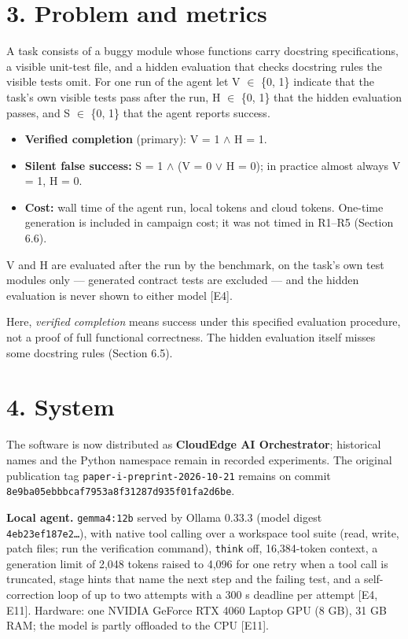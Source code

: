 \documentclass[11pt]{article}
\newcommand{\code}[1]{\texttt{#1}}
\begin{document}
\section*{3. Problem and metrics}
A task consists of a buggy module whose functions carry docstring specifications, a visible unit-test file, and a hidden evaluation that checks docstring rules the visible tests omit. For one run of the agent let V $\in$ \{0, 1\} indicate that the task's own visible tests pass after the run, H $\in$ \{0, 1\} that the hidden evaluation passes, and S $\in$ \{0, 1\} that the agent reports success.

\begin{itemize}
\item \textbf{Verified completion} (primary): V = 1 $\wedge$ H = 1.
\item \textbf{Silent false success:} S = 1 $\wedge$ (V = 0 $\vee$ H = 0); in practice almost always V = 1, H = 0.
\item \textbf{Cost:} wall time of the agent run, local tokens and cloud tokens. One-time generation is included in campaign cost; it was not timed in R1–R5 (Section 6.6).
\end{itemize}
V and H are evaluated after the run by the benchmark, on the task’s own test modules only — generated contract tests are excluded — and the hidden evaluation is never shown to either model [E4].

Here, \emph{verified completion} means success under this specified evaluation procedure, not a proof of full functional correctness. The hidden evaluation itself misses some docstring rules (Section 6.5).

\section*{4. System}
The software is now distributed as \textbf{CloudEdge AI Orchestrator}; historical names and the Python namespace remain in recorded experiments. The original publication tag \code{paper-\allowbreak{}i-\allowbreak{}preprint-\allowbreak{}2026-\allowbreak{}10-\allowbreak{}21} remains on commit \code{8e9ba05ebbbcaf7953a8f31287d935f01fa2d6be}.

\textbf{Local agent.} \code{gemma4:12b} served by Ollama 0.33.3 (model digest \code{4eb23ef187e2…}), with native tool calling over a workspace tool suite (read, write, patch files; run the verification command), \code{think} off, 16,384-token context, a generation limit of 2,048 tokens raised to 4,096 for one retry when a tool call is truncated, stage hints that name the next step and the failing test, and a self-correction loop of up to two attempts with a 300 s deadline per attempt [E4, E11]. Hardware: one NVIDIA GeForce RTX 4060 Laptop GPU (8 GB), 31 GB RAM; the model is partly offloaded to the CPU [E11].
\end{document}
